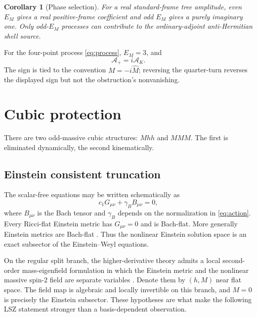 \documentclass[11pt]{article}
\newtheorem{corollary}[theorem]{Corollary}
\theoremstyle{definition}
\theoremstyle{remark}
\begin{document}
\begin{corollary}[Phase selection]\label{cor:phase}
For a real standard-frame tree amplitude, even $E_M$ gives a real
positive-frame coefficient and odd $E_M$ gives a purely imaginary one.
Only odd-$E_M$ processes can contribute to the ordinary-adjoint
anti-Hermitian shell source.
\end{corollary}

For the four-point process \eqref{eq:process}, $E_M=3$, and
\begin{equation}\label{eq:mmmhphase}
\mathcal A_+=i\mathcal A_K.
\end{equation}
The sign is tied to the convention $M=-i\widehat M$; reversing the
quarter-turn reverses the displayed sign but not the obstruction's
nonvanishing.

\section{Cubic protection}\label{sec:cubic}

There are two odd-massive cubic structures: $Mhh$ and $MMM$.  The first
is eliminated dynamically, the second kinematically.

\subsection{Einstein consistent truncation}

The scalar-free equations may be written schematically as
\begin{equation}\label{eq:ewfield}
c_1G_{\mu\nu}+\gamma_B B_{\mu\nu}=0,
\end{equation}
where $B_{\mu\nu}$ is the Bach tensor and $\gamma_B$ depends on the
normalization in \eqref{eq:action}.  Every Ricci-flat Einstein metric has
$G_{\mu\nu}=0$ and is Bach-flat.  More generally Einstein metrics are
Bach-flat \cite{LiuLuPope}.  Thus the nonlinear Einstein solution space
is an exact subsector of the Einstein--Weyl equations.

On the regular split branch, the higher-derivative theory admits a local
second-order mass-eigenfield formulation in which the Einstein metric and
the nonlinear massive spin-$2$ field are separate variables
\cite{MagnanoSokolowski}.  Denote them by $(h,M)$ near flat space.  The
field map is algebraic and locally invertible on this branch, and $M=0$
is precisely the Einstein subsector.  These hypotheses are what make the
following LSZ statement stronger than a basis-dependent observation.
\end{document}
